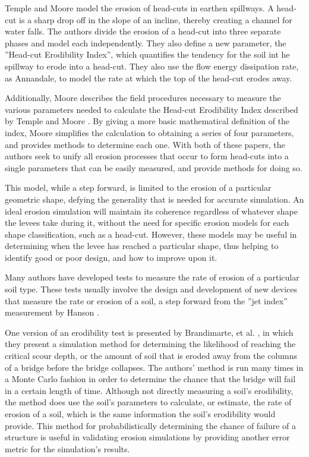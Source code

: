 Temple and Moore \cite{Temple-HeadcutAdvance} model the erosion of head-cuts in earthen spillways. A head-cut is a sharp drop off in the slope of an incline, thereby creating a channel for water falls. The authors divide the erosion of a head-cut into three separate phases and model each independently. They also define a new parameter, the ''Head-cut Erodibility Index'', which quantifies the tendency for the soil int he spillway to erode into a head-cut. They also use the flow energy dissipation rate, as Annandale, to model the rate at which the top of the head-cut erodes away.

Additionally, Moore \cite{Moore-FieldProcedures} describes the field procedures necessary to measure the various parameters needed to calculate the Head-cut Erodibility Index described by Temple and Moore \cite{Temple-HeadcutAdvance}. By giving a more basic mathematical definition of the index, Moore simplifies the calculation to obtaining a series of four parameters, and provides methods to determine each one. With both of these papers, the authors seek to unify all erosion processes that occur to form head-cuts into a single parameters that can be easily measured, and provide methods for doing so.

This model, while a step forward, is limited to the erosion of a particular geometric shape, defying the generality that is needed for accurate simulation. An ideal erosion simulation will maintain its coherence regardless of whatever shape the levees take during it, without the need for specific erosion models for each shape classification, such as a head-cut. However, these models may be useful in determining when the levee has reached a particular shape, thus helping to identify good or poor design, and how to improve upon it.


Many authors have developed tests to measure the rate of erosion of a particular soil type. These tests usually involve the design and development of new devices that measure the rate or erosion of a soil, a step forward from the ''jet index'' measurement by Hanson \cite{Hanson-JetIndex}.

One version of an erodibility test is presented by Brandimarte, et al. \cite{Brandimarte-StochasticFlow}, in which they present a simulation method for determining the likelihood of reaching the critical scour depth, or the amount of soil that is eroded away from the columns of a bridge before the bridge collapses. The authors' method is run many times in a Monte Carlo fashion in order to determine the chance that the bridge will fail in a certain length of time. Although not directly measuring a soil's erodibility, the method does use the soil's parameters to calculate, or estimate, the rate of erosion of a soil, which is the same information the soil's erodibility would provide. This method for probabilistically determining the chance of failure of a structure is useful in validating erosion simulations by providing another error metric for the simulation's results.

